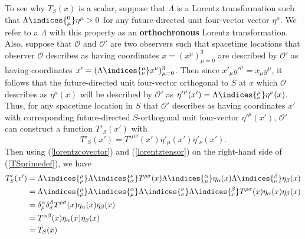 \documentclass[12pt]{report}
\begin{document}
To see why $T_S(x)$ is a scalar, suppose that $\Lambda$ is a Lorentz transformation such that $\Lambda\indices{^0_\mu}\eta^\mu>0$ for any future-directed  unit four-vector vector $\eta^\mu$. We refer to a $\Lambda$ with this property as an \textbf{orthochronous} Lorentz transformation. Also, suppose that $\mathcal{O}$ and $\mathcal{O}'$ are two observers such that spacetime locations that observer $\mathcal{O}$ describes as having coordinates $x=(x^\mu)_{\mu=0}^3$ are described by $\mathcal{O}'$ as having coordinates $x'=(\Lambda\indices{^\mu_\nu}x^\nu)_{\mu=0}^3$. %
%
 Then since ${x'}_\mu{y'}^\mu= x_\mu y^\mu$, it follows that the future-directed unit four-vector orthogonal to $S$ at $x$ which $\mathcal{O}$ describes as $\eta^\mu(x)$ will be described by $\mathcal{O}'$ as  ${\eta'}^\mu(x')=\Lambda\indices{^\mu_\nu}\eta^\nu(x)$. %
  Thus, for any spacetime location in $S$ that $\mathcal{O}'$ describes as having coordinates $x'$ with corresponding  future-directed $S$-orthogonal unit four-vector ${\eta'}^\mu(x')$, $\mathcal{O}'$ can construct a function $T'_S(x')$  with 
\begin{equation}\label{TSprimedef}
T'_S(x')=T'^{\mu\nu}(x')\eta'_{\mu}(x')\eta'_{\nu}(x').
\end{equation} %
%
Then using  (\ref{lorentzcovector}) and (\ref{lorentztensor}) on the right-hand side of (\ref{TSprimedef}),  we have
\begin{equation}\label{invariantTS1}
\begin{split}
T'_S(x')&=\Lambda\indices{^\mu_\rho}\Lambda\indices{^\nu_\sigma}T^{\rho\sigma}(x)\Lambda\indices{_\mu^\alpha}\eta_{\alpha}(x)\Lambda\indices{_\nu^\beta}\eta_{\beta}(x)\\
&=\Lambda\indices{^\mu_\rho}\Lambda\indices{_\mu^\alpha} \Lambda\indices{^\nu_\sigma}\Lambda\indices{_\nu^\beta}T^{\rho\sigma}(x)\eta_{\alpha}(x)\eta_{\beta}(x)\\
&=\delta^\alpha_\rho\delta^\beta_\sigma T^{\rho\sigma}(x)\eta_{\alpha}(x)\eta_{\beta}(x)\\
&=T^{\alpha\beta}(x)\eta_{\alpha}(x)\eta_{\beta}(x)\\
&=T_S(x)
\end{split}
\end{equation}
\end{document}
